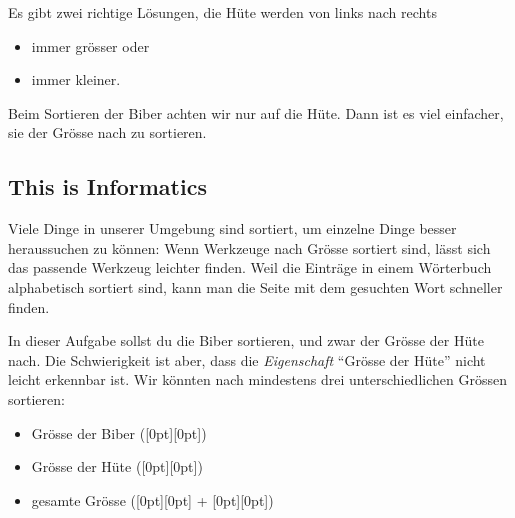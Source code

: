 \documentclass[a4paper,11pt]{report}
\newcommand{\taskGraphicsFolder}{..}
\begin{document}
Es gibt zwei richtige Lösungen, die Hüte werden von links nach rechts

\begin{itemize}
  \item immer grösser oder
  \item immer kleiner.
\end{itemize}

Beim Sortieren der Biber achten wir nur auf die Hüte. Dann ist es viel einfacher, sie der Grösse nach zu sortieren.

{\centering%
\raisebox{-0.5ex}{}    \raisebox{-0.5ex}{}\par}


\subsection*{This is Informatics}

Viele Dinge in unserer Umgebung sind sortiert, um einzelne Dinge besser heraussuchen zu können: Wenn Werkzeuge nach Grösse sortiert sind, lässt sich das passende Werkzeug leichter finden.  Weil die Einträge in einem Wörterbuch alphabetisch sortiert sind, kann man die Seite mit dem gesuchten Wort schneller finden.

In dieser Aufgabe sollst du die Biber sortieren, und zwar der Grösse der Hüte nach. Die Schwierigkeit ist aber, dass die \emph{Eigenschaft} \enquote{Grösse der Hüte} nicht leicht erkennbar ist. Wir könnten nach mindestens drei unterschiedlichen Grössen sortieren:

\begin{itemize}
  \item Grösse der Biber (\raisebox{-0.5ex}[0pt][0pt]{})
  \item Grösse der Hüte (\raisebox{-0.5ex}[0pt][0pt]{})
  \item gesamte Grösse (\raisebox{-0.5ex}[0pt][0pt]{} + \raisebox{-0.5ex}[0pt][0pt]{})
\end{itemize}

{\centering%
\par}
\end{document}
